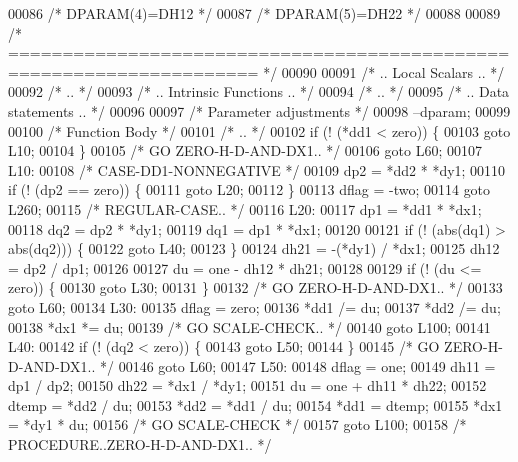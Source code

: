 \begin{DoxyCode}
00086 \textcolor{comment}{/*     DPARAM(4)=DH12 */}
00087 \textcolor{comment}{/*     DPARAM(5)=DH22 */}
00088 
00089 \textcolor{comment}{/*  ===================================================================== */}
00090 
00091 \textcolor{comment}{/*     .. Local Scalars .. */}
00092 \textcolor{comment}{/*     .. */}
00093 \textcolor{comment}{/*     .. Intrinsic Functions .. */}
00094 \textcolor{comment}{/*     .. */}
00095 \textcolor{comment}{/*     .. Data statements .. */}
00096 
00097     \textcolor{comment}{/* Parameter adjustments */}
00098     --dparam;
00099 
00100     \textcolor{comment}{/* Function Body */}
00101 \textcolor{comment}{/*     .. */}
00102     \textcolor{keywordflow}{if} (! (*dd1 < zero)) \{
00103     \textcolor{keywordflow}{goto} L10;
00104     \}
00105 \textcolor{comment}{/*       GO ZERO-H-D-AND-DX1.. */}
00106     \textcolor{keywordflow}{goto} L60;
00107 L10:
00108 \textcolor{comment}{/*     CASE-DD1-NONNEGATIVE */}
00109     dp2 = *dd2 * *dy1;
00110     \textcolor{keywordflow}{if} (! (dp2 == zero)) \{
00111     \textcolor{keywordflow}{goto} L20;
00112     \}
00113     dflag = -two;
00114     \textcolor{keywordflow}{goto} L260;
00115 \textcolor{comment}{/*     REGULAR-CASE.. */}
00116 L20:
00117     dp1 = *dd1 * *dx1;
00118     dq2 = dp2 * *dy1;
00119     dq1 = dp1 * *dx1;
00120 
00121     \textcolor{keywordflow}{if} (! (abs(dq1) > abs(dq2))) \{
00122     \textcolor{keywordflow}{goto} L40;
00123     \}
00124     dh21 = -(*dy1) / *dx1;
00125     dh12 = dp2 / dp1;
00126 
00127     du = one - dh12 * dh21;
00128 
00129     \textcolor{keywordflow}{if} (! (du <= zero)) \{
00130     \textcolor{keywordflow}{goto} L30;
00131     \}
00132 \textcolor{comment}{/*         GO ZERO-H-D-AND-DX1.. */}
00133     \textcolor{keywordflow}{goto} L60;
00134 L30:
00135     dflag = zero;
00136     *dd1 /= du;
00137     *dd2 /= du;
00138     *dx1 *= du;
00139 \textcolor{comment}{/*         GO SCALE-CHECK.. */}
00140     \textcolor{keywordflow}{goto} L100;
00141 L40:
00142     \textcolor{keywordflow}{if} (! (dq2 < zero)) \{
00143     \textcolor{keywordflow}{goto} L50;
00144     \}
00145 \textcolor{comment}{/*         GO ZERO-H-D-AND-DX1.. */}
00146     \textcolor{keywordflow}{goto} L60;
00147 L50:
00148     dflag = one;
00149     dh11 = dp1 / dp2;
00150     dh22 = *dx1 / *dy1;
00151     du = one + dh11 * dh22;
00152     dtemp = *dd2 / du;
00153     *dd2 = *dd1 / du;
00154     *dd1 = dtemp;
00155     *dx1 = *dy1 * du;
00156 \textcolor{comment}{/*         GO SCALE-CHECK */}
00157     \textcolor{keywordflow}{goto} L100;
00158 \textcolor{comment}{/*     PROCEDURE..ZERO-H-D-AND-DX1.. */}

\end{DoxyCode}

